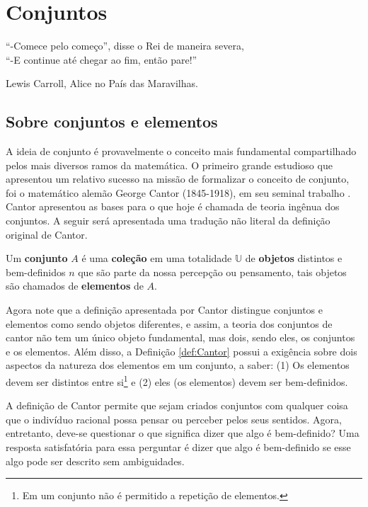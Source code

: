 \chapter{Conjuntos}\label{cap:Sets}

\epigraph{``-Comece pelo começo'', disse o Rei de maneira severa,\\ ``-E continue até chegar ao fim, então pare!''}{Lewis Carroll, Alice no País das Maravilhas.}

\section{Sobre conjuntos e elementos}\label{sec:ConjuntoElemento}

A ideia de conjunto é provavelmente o conceito mais fundamental compartilhado pelos mais diversos ramos da matemática. O primeiro grande estudioso que apresentou um relativo sucesso na missão de formalizar o conceito de conjunto, foi o matemático alemão George Cantor (1845-1918), em seu seminal trabalho \cite{cantor1895}. Cantor apresentou as bases para o que hoje é chamada de teoria ingênua dos conjuntos. A seguir será apresentada uma tradução não literal da definição original de Cantor.

\begin{definicao}\label{def:Cantor}
  Um \textbf{conjunto} $A$ é uma \textbf{coleção} em uma totalidade $\mathbb{U}$ de \textbf{objetos} distintos e bem-definidos $n$ que são parte da nossa percepção ou pensamento, tais objetos são chamados de \textbf{elementos} de $A$.
\end{definicao}

Agora note que a definição apresentada por Cantor distingue conjuntos e elementos como sendo objetos diferentes, e assim, a teoria dos conjuntos de cantor não tem um único objeto fundamental, mas dois, sendo eles, os conjuntos e os elementos. Além disso, a Definição \ref{def:Cantor} possui a exigência sobre dois aspectos da natureza dos elementos em um conjunto, a saber:  (1) Os elementos devem ser distintos entre si\footnote{Em um conjunto não é permitido a repetição de elementos.} e (2) eles (os elementos) devem ser bem-definidos.

A definição de Cantor permite que sejam criados conjuntos com qualquer coisa que o indivíduo racional possa pensar ou perceber pelos seus sentidos. Agora, entretanto, deve-se questionar o que significa dizer que algo é bem-definido? Uma resposta satisfatória para essa perguntar é dizer que algo é bem-definido se esse algo pode ser descrito sem ambiguidades.

